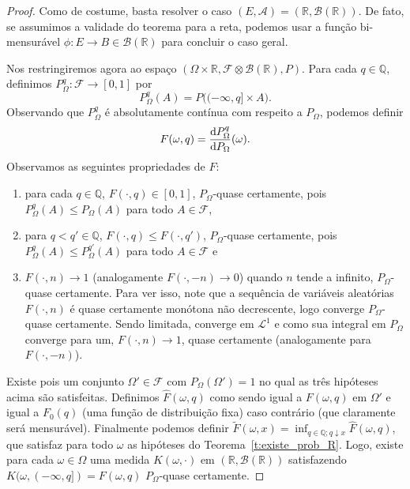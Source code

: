 \begin{proof}
  Como de costume, basta resolver o caso $(E, \mathcal{A}) = (\mathbb{R}, \mathcal{B}(\mathbb{R}))$.
  De fato, se assumimos a validade do teorema para a reta, podemos usar a função bi-mensurável $\phi: E \to B \in \mathcal{B}(\mathbb{R})$ para concluir o caso geral.

  Nos restringiremos agora ao espaço $(\Omega \times \mathbb{R}, \mathcal{F} \otimes \mathcal{B}(\mathbb{R}), P)$.
  Para cada $q \in \mathbb{Q}$, definimos $P^q_\Omega : \mathcal{F} \to [0,1]$ por
  \begin{equation}
    P^q_\Omega (A) = P\big( (-\infty, q] \times A \big).
  \end{equation}
  Observando que $P^q_\Omega$ é absolutamente contínua com respeito a $P_\Omega$, podemos definir
  \begin{equation}
    F(\omega, q) = \frac{\mathop{}\!\mathrm{d} P^q_\Omega}{\mathop{}\!\mathrm{d} P_\Omega}(\omega).
  \end{equation}
  Observamos as seguintes propriedades de $F$:
  \begin{enumerate}[\quad a)]
  \item para cada $q \in \mathbb{Q}$, $F(\cdot, q) \in [0,1]$, $P_\Omega$-quase certamente, pois $P^q_\Omega(A) \leq P_\Omega(A)$ para todo $A \in \mathcal{F}$,
  \item para $q < q' \in \mathbb{Q}$, $F(\cdot, q) \leq F(\cdot, q')$, $P_\Omega$-quase certamente, pois $P^q_\Omega(A) \leq P^{q'}_\Omega(A)$ para todo $A \in \mathcal{F}$ e
  \item $F(\cdot, n) \to 1$ (analogamente $F(\cdot, -n) \to 0$) quando $n$ tende a infinito, $P_\Omega$-quase certamente.
    Para ver isso, note que a sequência de variáveis aleatórias $F(\cdot, n)$ é quase certamente monótona não decrescente, logo converge $P_\Omega$-quase certamente.
    Sendo limitada, converge em $\mathcal{L}^1$ e como sua integral em $P_\Omega$ converge para um, $F(\cdot, n) \to 1$, quase certamente (analogamente para $F(\cdot, -n)$).
  \end{enumerate}
  Existe pois um conjunto $\Omega' \in \mathcal{F}$ com $P_\Omega(\Omega') = 1$ no qual as três hipóteses acima são satisfeitas.
  Definimos $\hat{F}(\omega, q)$ como sendo igual a $F(\omega, q)$ em $\Omega'$ e igual a $F_0(q)$ (uma função de distribuição fixa) caso contrário (que claramente será mensurável).
  Finalmente podemos definir $\tilde{F}(\omega, x) = \inf_{q \in \mathbb{Q}; q \downarrow x} \hat{F}(\omega, q)$, que satisfaz para todo $\omega$ as hipóteses do Teorema~\ref{t:existe_prob_R}.
  Logo, existe para cada $\omega \in \Omega$ uma medida $K(\omega, \cdot)$ em $(\mathbb{R}, \mathcal{B}(\mathbb{R}))$ satisfazendo $K(\omega,(-\infty, q]) = F(\omega, q)$ $P_\Omega$-quase certamente.


\end{proof}
